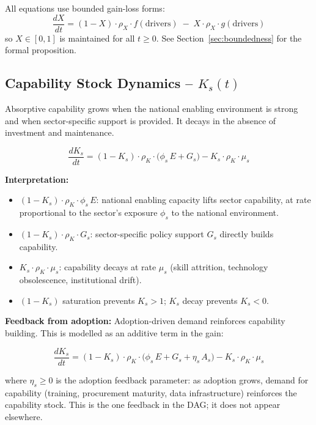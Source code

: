 \documentclass[11pt,a4paper]{article}
\begin{document}
All equations use bounded gain-loss forms:
\[
\frac{dX}{dt} = (1 - X)\cdot\rho_X \cdot f(\text{drivers}) \;-\; X\cdot\rho_X \cdot g(\text{drivers})
\]
so $X \in [0,1]$ is maintained for all $t \geq 0$. See Section~\ref{sec:boundedness} for the formal proposition.

\subsection{Capability Stock Dynamics -- \texorpdfstring{$K_s(t)$}{Ks(t)}}

Absorptive capability grows when the national enabling environment is strong and when sector-specific support is provided. It decays in the absence of investment and maintenance.

\begin{equation}
\boxed{
\frac{dK_s}{dt}
= (1 - K_s)\cdot\rho_K\cdot\bigl(\phi_s\, E + G_s\bigr)
- K_s\cdot\rho_K\cdot\mu_s
}
\end{equation}

\textbf{Interpretation:}
\begin{itemize}
  \item $(1 - K_s)\cdot\rho_K\cdot\phi_s\, E$: national enabling capacity lifts sector capability, at rate proportional to the sector's exposure $\phi_s$ to the national environment.
  \item $(1 - K_s)\cdot\rho_K\cdot G_s$: sector-specific policy support $G_s$ directly builds capability.
  \item $K_s\cdot\rho_K\cdot\mu_s$: capability decays at rate $\mu_s$ (skill attrition, technology obsolescence, institutional drift).
  \item $(1 - K_s)$ saturation prevents $K_s > 1$; $K_s$ decay prevents $K_s < 0$.
\end{itemize}

\textbf{Feedback from adoption:} Adoption-driven demand reinforces capability building. This is modelled as an additive term in the gain:

\begin{equation}
\boxed{
\frac{dK_s}{dt}
= (1 - K_s)\cdot\rho_K\cdot\bigl(\phi_s\, E + G_s + \eta_s\, A_s\bigr)
- K_s\cdot\rho_K\cdot\mu_s
}
\label{eq:Ks}
\end{equation}

where $\eta_s \geq 0$ is the adoption feedback parameter: as adoption grows, demand for capability (training, procurement maturity, data infrastructure) reinforces the capability stock. This is the one feedback in the DAG; it does not appear elsewhere.
\end{document}
